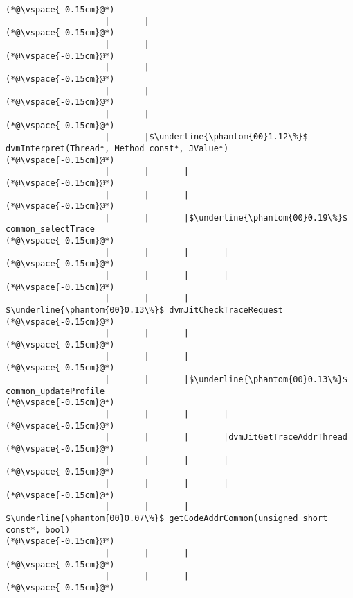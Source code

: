 \begin{lstlisting}[caption=20 viiteparametria (C$\to$Java) , label=profile:C2JBenchmark00206, numberbychapter=true, frame=lines, float, floatplacement=t]
(*@\vspace{-0.15cm}@*)
                    |       |
(*@\vspace{-0.15cm}@*)
                    |       |
(*@\vspace{-0.15cm}@*)
                    |       |
(*@\vspace{-0.15cm}@*)
                    |       |
(*@\vspace{-0.15cm}@*)
                    |       |
(*@\vspace{-0.15cm}@*)
                    |       |$\underline{\phantom{00}1.12\%}$ dvmInterpret(Thread*, Method const*, JValue*)
(*@\vspace{-0.15cm}@*)
                    |       |       |
(*@\vspace{-0.15cm}@*)
                    |       |       |
(*@\vspace{-0.15cm}@*)
                    |       |       |$\underline{\phantom{00}0.19\%}$ common_selectTrace
(*@\vspace{-0.15cm}@*)
                    |       |       |       |
(*@\vspace{-0.15cm}@*)
                    |       |       |       |
(*@\vspace{-0.15cm}@*)
                    |       |       |        $\underline{\phantom{00}0.13\%}$ dvmJitCheckTraceRequest
(*@\vspace{-0.15cm}@*)
                    |       |       |
(*@\vspace{-0.15cm}@*)
                    |       |       |
(*@\vspace{-0.15cm}@*)
                    |       |       |$\underline{\phantom{00}0.13\%}$    common_updateProfile
(*@\vspace{-0.15cm}@*)
                    |       |       |       |
(*@\vspace{-0.15cm}@*)
                    |       |       |       |dvmJitGetTraceAddrThread
(*@\vspace{-0.15cm}@*)
                    |       |       |       |
(*@\vspace{-0.15cm}@*)
                    |       |       |       |
(*@\vspace{-0.15cm}@*)
                    |       |       |        $\underline{\phantom{00}0.07\%}$ getCodeAddrCommon(unsigned short const*, bool)
(*@\vspace{-0.15cm}@*)
                    |       |       |
(*@\vspace{-0.15cm}@*)
                    |       |       |
(*@\vspace{-0.15cm}@*)

\end{lstlisting}

